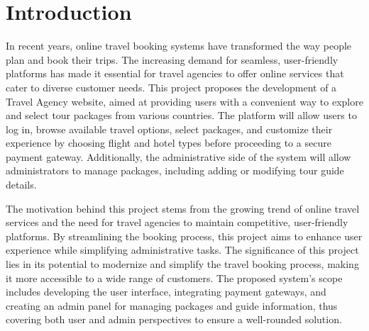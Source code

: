 \newpage
\section{Introduction}
In recent years, online travel booking systems have transformed the way people plan and book their trips. The increasing demand for seamless, user-friendly platforms has made it essential for travel agencies to offer online services that cater to diverse customer needs. This project proposes the development of a Travel Agency website, aimed at providing users with a convenient way to explore and select tour packages from various countries. The platform will allow users to log in, browse available travel options, select packages, and customize their experience by choosing flight and hotel types before proceeding to a secure payment gateway. Additionally, the administrative side of the system will allow administrators to manage packages, including adding or modifying tour guide details.

The motivation behind this project stems from the growing trend of online travel services and the need for travel agencies to maintain competitive, user-friendly platforms. By streamlining the booking process, this project aims to enhance user experience while simplifying administrative tasks. The significance of this project lies in its potential to modernize and simplify the travel booking process, making it more accessible to a wide range of customers. The proposed system's scope includes developing the user interface, integrating payment gateways, and creating an admin panel for managing packages and guide information, thus covering both user and admin perspectives to ensure a well-rounded solution.
